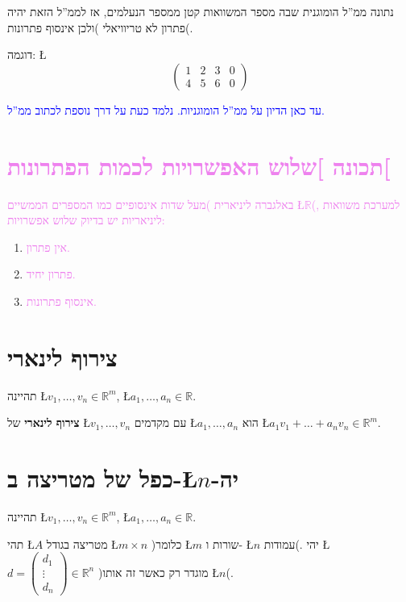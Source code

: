 \documentclass[english,hebrew]{article}
\begin{document}
נתונה ממ\textquotedblright ל הומוגנית שבה מספר המשוואות קטן ממספר
הנעלמים, אז לממ\textquotedblright ל הזאת יהיה פתרון לא טריוויאלי )ולכן
אינסוף פתרונות(.

דוגמה: \L{%
\[
\left(\begin{array}{ccc|c}
1 & 2 & 3 & 0\\
4 & 5 & 6 & 0
\end{array}\right)
\]
}%

\textcolor{blue}{עד כאן הדיון על ממ\textquotedblright ל הומוגניות.
נלמד כעת על דרך נוספת לכתוב ממ\textquotedblright ל.}

\section{\textcolor{violet}{תכונה {]}שלוש האפשרויות לכמות הפתרונות{[}}}

\textcolor{violet}{באלגברה ליניארית )מעל שדות אינסופיים כמו המספרים
הממשיים \L{$\mathbb{R}$}(, למערכת משוואות ליניאריות יש בדיוק שלוש
אפשרויות:}
\begin{enumerate}
\item \textcolor{violet}{אין פתרון.}
\item \textcolor{violet}{פתרון יחיד.}
\item \textcolor{violet}{אינסוף פתרונות.}
\end{enumerate}

\section{צירוף לינארי}

תהיינה \L{$v_{1},\dots,v_{n}\in\mathbb{R}^{m}$}, \L{$a_{1},\dots,a_{n}\in\mathbb{R}$}.

\textbf{צירוף לינארי} של \L{$v_{1},\dots,v_{n}$} עם מקדמים \L{$a_{1},\dots,a_{n}$}
הוא \L{$a_{1}v_{1}+\dots+a_{n}v_{n}\in\mathbb{R}^{m}$}.

\section{כפל של מטריצה ב-\L{$n$}-יה}

תהיינה \L{$v_{1},\dots,v_{n}\in\mathbb{R}^{m}$}, \L{$a_{1},\dots,a_{n}\in\mathbb{R}$}.

תהי \L{$A$} מטריצה בגודל \L{$m\times n$} )כלומר \L{$m$} שורות ו-
\L{$n$} עמודות(. יהי \L{$d=\begin{pmatrix}d_{1}\\
\vdots\\
d_{n}
\end{pmatrix}\in\mathbb{R}^{n}$} )מוגדר רק כאשר זה אותו \L{$n$}(.
\end{document}
